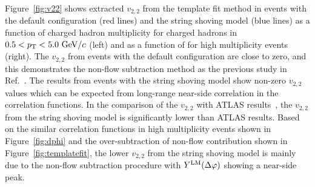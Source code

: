 Figure~\ref{fig:v22} shows extracted $v_{2,2}$ from the template fit method in \pythia events with the default configuration (red lines) and the string shoving model (blue lines) as a function of charged hadron multiplicity \Nch for charged hadrons in $0.5<\mbox{$p_{\mathrm{T}}$}<5.0~\mathrm{GeV}/c$ (left) and as a function of \pt for high multiplicity events (right).
The $v_{2,2}$ from \pythia events with the default configuration are close to zero, and this demonstrates the non-flow subtraction method as the previous study in Ref.~\cite{Lim:2019cys}.
The results from \pythia events with the string shoving model show non-zero $v_{2,2}$ values which can be expected from long-range near-side correlation in the correlation functions.
In the comparison of the $v_{2,2}$ with ATLAS results~\cite{Aad:2015gqa}, the $v_{2,2}$ from the string shoving model is significantly lower than ATLAS results.
Based on the similar correlation functions in high multiplicity events shown in Figure~\ref{fig:dphi} and the over-subtraction of non-flow contribution shown in Figure~\ref{fig:templatefit}, the lower $v_{2,2}$ from the string shoving model is mainly due to the non-flow subtraction procedure with $Y^\mathrm{LM}(\mbox{$\Delta\varphi$})$ showing a near-side peak.



